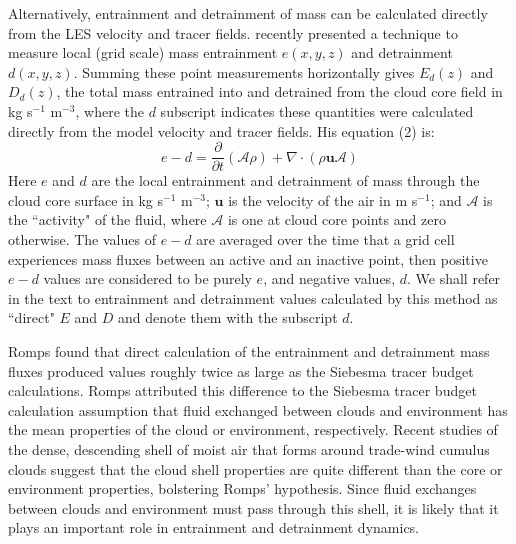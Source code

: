 \documentclass[12pt]{article}
\begin{document}
Alternatively, entrainment and detrainment of mass can be calculated directly
from the LES velocity and tracer fields.  \cite{Romps2010} recently presented a 
technique to measure local (grid scale) mass entrainment $e(x,y,z)$ and
detrainment $d(x,y,z)$.  Summing these point measurements horizontally gives 
$E_d(z)$ and $D_d(z)$, the total mass entrained into and detrained from the
cloud core field in kg s$^{-1}$ m$^{-3}$, where the $d$ subscript indicates 
these quantities were calculated directly from the model velocity and tracer
fields.  His equation (2) is:
\begin{equation}
  \label{eq:romps_e_minus_d}
  e - d = \frac{\partial}{\partial t}(\mathcal{A}\rho) 
        + \nabla \cdot (\rho \mathbf{u} \mathcal{A}) 
\end{equation}
Here $e$ and $d$ are the local entrainment and detrainment of mass
through the cloud core surface in kg s$^{-1}$ m$^{-3}$; $\mathbf{u}$
is the velocity of the air in m s$^{-1}$; and $\mathcal{A}$ is the
``activity" of the fluid, where $\mathcal{A}$ is one at cloud core
points and zero otherwise.  The values of $e - d$ are averaged over
the time that a grid cell experiences mass fluxes between an active
and an inactive point, then positive $e-d$ values are considered to be
purely $e$, and negative values, $d$.  We shall refer in the text to
entrainment and detrainment values calculated by this method as
``direct" $E$ and $D$ and denote them with the subscript $d$.

Romps found that direct calculation of the entrainment and
detrainment mass fluxes produced values roughly twice as large as
the Siebesma tracer budget calculations.  Romps attributed this difference
to the Siebesma tracer budget calculation assumption that fluid
exchanged between clouds and environment has the mean properties of
the cloud or environment, respectively.  Recent studies of the dense,
descending shell of moist air that forms around trade-wind cumulus
clouds \citep{Heus2008, Wang2010} suggest that the cloud shell
properties are quite different than the core or environment
properties, bolstering Romps' hypothesis.  Since fluid exchanges
between clouds and environment must pass through this shell, it is
likely that it plays an important role in entrainment and detrainment
dynamics.
\end{document}
